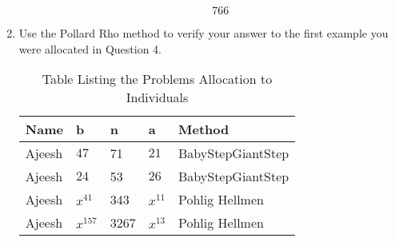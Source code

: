 \documentclass[11pt,a4paper,fleqn]{article}
\begin{document}
\begin{enumerate}[1.]
\begin{flushleft}
\begin{enumerate}
\begin{mdframed}
					\begin{dmath}\label{(10)}
						766
					\end{dmath}
				\end{mdframed}
			\end{enumerate}
		\end{flushleft}
		\item Use the Pollard Rho method to verify your answer to the first example you were allocated in Question 4. 
		
		\begin{table}[H]
			\begin{adjustbox}{scale=0.9,center}
				\begin{tabular}{ |p{2cm}|p{2cm}|p{2cm}|p{2cm}|p{4cm}| }
					\hline
					Name & b & n & a & Method \\
					\hline
					Ajeesh & $47$   & 71   & $21$   & BabyStepGiantStep \\
					Ajeesh & $24$   & 53   & $26$   & BabyStepGiantStep  \\
					Ajeesh & $x^{41}$ & 343  & $x^{11}$ & Pohlig Hellmen \\
					Ajeesh & $x^{157}$& 3267 & $x^{13}$ & Pohlig Hellmen  \\
					\hline
				\end{tabular}
			\end{adjustbox}
			\caption{Table Listing the Problems Allocation to Individuals}
			\label{table:assignment-tab}
		\end{table}
		

\end{enumerate}
\end{document}
